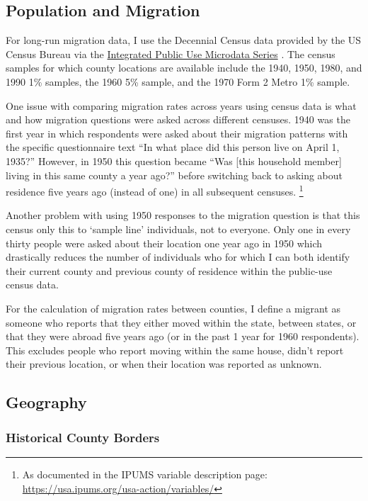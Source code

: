 \documentclass[12pt]{article}
\begin{document}
\subsection{Population and Migration}\label{population-and-migration}

For long-run migration data, I use the Decennial Census data provided by
the US Census Bureau via the
\href{https://usa.ipums.org/usa/index.shtml}{Integrated Public Use
Microdata Series} \citep{ruggles_ipums_2024}. The census
samples for which county locations are available include the 1940, 1950,
1980, and 1990 1\% samples, the 1960 5\% sample, and the 1970 Form 2
Metro 1\% sample.

One issue with comparing migration rates across years using census data is what and how migration questions were asked across different censuses.
1940 was the first year in which respondents were asked about their migration patterns with the specific questionnaire text
``In what place did this person live on April 1, 1935?''
However, in 1950 this question became
``Was [this household member] living in this same county a year ago?''
before switching back to asking about residence five years ago (instead of one) in all subsequent censuses.
\footnote{As documented in the IPUMS variable description page: \url{https://usa.ipums.org/usa-action/variables/}}

Another problem with using 1950 responses to the migration question is that 
this census only this to `sample line' individuals, not to everyone.
Only one in every thirty people were asked about their location one year ago
in 1950 which drastically reduces the number of individuals who for which I can both 
identify their current county and previous county of residence within the public-use census data.

For the calculation of migration rates between counties, I define a
migrant as someone who reports that they either moved within the state,
between states, or that they were abroad five years ago (or in the past
1 year for 1960 respondents). This excludes people who report moving
within the same house, didn't report their previous location, or when their
location was reported as unknown.

\subsection{Geography}\label{geography}

\subsubsection{Historical County Borders}\label{historical-county-borders}
\end{document}
